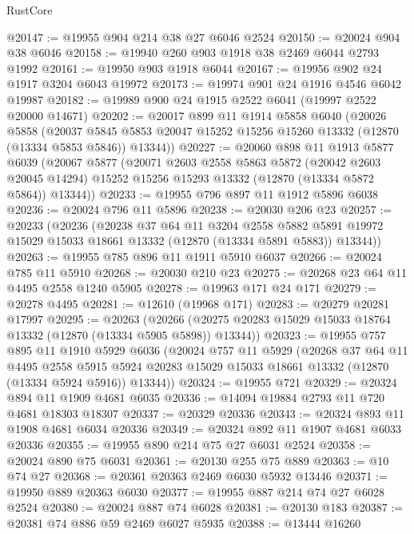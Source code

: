 \begin{lexlean}{RustCore}
\begin{coremodule}
@20147 := @19955 @904 @214 @38 @27 @6046 @2524
@20150 := @20024 @904 @38 @6046
@20158 := @19940 @260 @903 @1918 @38 @2469 @6044 @2793 @1992
@20161 := @19950 @903 @1918 @6044
@20167 := @19956 @902 @24 @1917 @3204 @6043 @19972
@20173 := @19974 @901 @24 @1916 @4546 @6042 @19987
@20182 := @19989 @900 @24 @1915 @2522 @6041 (@19997 @2522 @20000 @14671)
@20202 := @20017
    @899
    @11
    @1914
    @5858
    @6040
    (@20026
      @5858
      (@20037 @5845 @5853 @20047 @15252 @15256 @15260 @13332 (@12870 (@13334 @5853 @5846)) @13344))
@20227 := @20060
    @898
    @11
    @1913
    @5877
    @6039
    (@20067
      @5877
      (@20071
        @2603
        @2558
        @5863
        @5872
        (@20042 @2603 @20045 @14294)
        @15252
        @15256
        @15293
        @13332
        (@12870 (@13334 @5872 @5864))
        @13344))
@20233 := @19955 @796 @897 @11 @1912 @5896 @6038
@20236 := @20024 @796 @11 @5896
@20238 := @20030 @206 @23
@20257 := @20233
    (@20236
      (@20238
        @37
        @64
        @11
        @3204
        @2558
        @5882
        @5891
        @19972
        @15029
        @15033
        @18661
        @13332
        (@12870 (@13334 @5891 @5883))
        @13344))
@20263 := @19955 @785 @896 @11 @1911 @5910 @6037
@20266 := @20024 @785 @11 @5910
@20268 := @20030 @210 @23
@20275 := @20268 @23 @64 @11 @4495 @2558 @1240 @5905
@20278 := @19963 @171 @24 @171
@20279 := @20278 @4495
@20281 := @12610 (@19968 @171)
@20283 := @20279 @20281 @17997
@20295 := @20263
    (@20266 (@20275 @20283 @15029 @15033 @18764 @13332 (@12870 (@13334 @5905 @5898)) @13344))
@20323 := @19955
    @757
    @895
    @11
    @1910
    @5929
    @6036
    (@20024
      @757
      @11
      @5929
      (@20268
        @37
        @64
        @11
        @4495
        @2558
        @5915
        @5924
        @20283
        @15029
        @15033
        @18661
        @13332
        (@12870 (@13334 @5924 @5916))
        @13344))
@20324 := @19955 @721
@20329 := @20324 @894 @11 @1909 @4681 @6035
@20336 := @14094 @19884 @2793 @11 @720 @4681 @18303 @18307
@20337 := @20329 @20336
@20343 := @20324 @893 @11 @1908 @4681 @6034 @20336
@20349 := @20324 @892 @11 @1907 @4681 @6033 @20336
@20355 := @19955 @890 @214 @75 @27 @6031 @2524
@20358 := @20024 @890 @75 @6031
@20361 := @20130 @255 @75 @889
@20363 := @10 @74 @27
@20368 := @20361 @20363 @2469 @6030 @5932 @13446
@20371 := @19950 @889 @20363 @6030
@20377 := @19955 @887 @214 @74 @27 @6028 @2524
@20380 := @20024 @887 @74 @6028
@20381 := @20130 @183
@20387 := @20381 @74 @886 @59 @2469 @6027 @5935
@20388 := @13444 @16260

\end{coremodule}
\end{lexlean}
